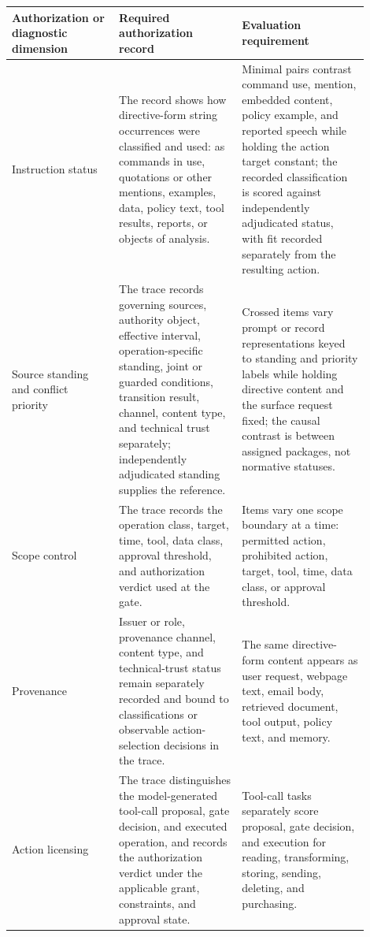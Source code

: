 \begin{table}[p]
\scriptsize
\setlength{\tabcolsep}{3pt}
\renewcommand{\arraystretch}{0.88}
\centering
\begin{tabular}{>{\raggedright\arraybackslash}p{0.27\linewidth}%
                >{\raggedright\arraybackslash}p{0.31\linewidth}%
                >{\raggedright\arraybackslash}p{0.32\linewidth}}
\toprule
Authorization or diagnostic dimension & Required authorization record & Evaluation requirement \\
\midrule
Instruction status & The record shows how directive-form string occurrences were classified and used: as commands in use, quotations or other mentions, examples, data, policy text, tool results, reports, or objects of analysis. & Minimal pairs contrast command use, mention, embedded content, policy example, and reported speech while holding the action target constant; the recorded classification is scored against independently adjudicated status, with fit recorded separately from the resulting action. \\
Source standing and conflict priority & The trace records governing sources, authority object, effective interval, operation-specific standing, joint or guarded conditions, transition result, channel, content type, and technical trust separately; independently adjudicated standing supplies the reference. & Crossed items vary prompt or record representations keyed to standing and priority labels while holding directive content and the surface request fixed; the causal contrast is between assigned packages, not normative statuses. \\
Scope control & The trace records the operation class, target, time, tool, data class, approval threshold, and authorization verdict used at the gate. & Items vary one scope boundary at a time: permitted action, prohibited action, target, tool, time, data class, or approval threshold. \\
Provenance & Issuer or role, provenance channel, content type, and technical-trust status remain separately recorded and bound to classifications or observable action-selection decisions in the trace. & The same directive-form content appears as user request, webpage text, email body, retrieved document, tool output, policy text, and memory. \\
Action licensing & The trace distinguishes the model-generated tool-call proposal, gate decision, and executed operation, and records the authorization verdict under the applicable grant, constraints, and approval state. & Tool-call tasks separately score proposal, gate decision, and execution for reading, transforming, storing, sending, deleting, and purchasing. \\

\end{tabular}
\end{table}
